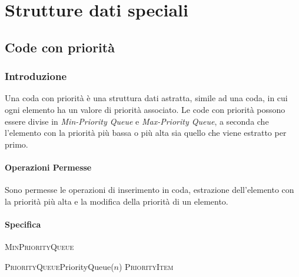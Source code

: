 \chapter{Strutture dati speciali}
\thispagestyle{chapterInit}
\section{Code con priorità}
    \subsection{Introduzione}
        Una coda con priorità è una struttura dati astratta, simile ad una coda, in cui ogni elemento ha un valore di priorità associato. Le code con priorità possono essere divise in \textit{Min-Priority Queue} e \textit{Max-Priority Queue}, a seconda che l'elemento con la priorità più bassa o più alta sia quello che viene estratto per primo.
        \subsubsection{Operazioni Permesse}
            Sono permesse le operazioni di inserimento in coda, estrazione dell'elemento con la priorità più alta e la modifica della priorità di un elemento.
        \subsubsection{Specifica}
            \begin{algorithm}
                \caption{\textsc{MinPriorityQueue}}
                \begin{algorithmic}
                    \State {}
                    \State \textsc{PriorityQueue}PriorityQueue(\Int $n$)
                    \State {}
                    \State \Bool {}
                    \State {}
                    \State \Item {}
                    \State {}
                    \State \Item {}
                    \State {}
                    \State \textsc{PriorityItem} 
                    \State {}
                    \State {}
                \end{algorithmic}
            \end{algorithm}
